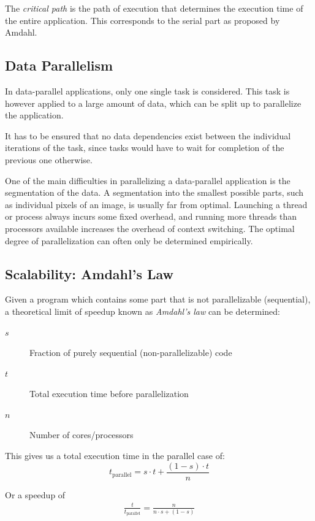 \documentclass[BCOR20mm,DIV14,10pt,headinclude,footexclude,bibtotoc,liststotoc]{article}
\begin{document}
The \emph{critical path} is the path of execution that determines the execution
time of the entire application. This corresponds to the serial part as proposed
by Amdahl.

\subsection{Data Parallelism}
In data-parallel applications, only one single task is considered. This task is
however applied to a large amount of data, which can be split up to parallelize
the application.

It has to be ensured that no data dependencies exist between the individual
iterations of the task, since tasks would have to wait for completion of the
previous one otherwise.

One of the main difficulties in parallelizing a data-parallel application is the
segmentation of the data. A segmentation into the smallest possible parts, such
as individual pixels of an image, is usually far from optimal. Launching a
thread or process always incurs some fixed overhead, and running more threads
than processors available increases the overhead of context switching. The
optimal degree of parallelization can often only be determined empirically.




\subsection{Scalability: Amdahl's Law}
Given a program which contains some part that is not parallelizable
(sequential), a theoretical limit of speedup known as \emph{Amdahl's law}
can be determined:
\begin{description}
	\item[$s$] Fraction of purely sequential (non-parallelizable) code
	\item[$t$] Total execution time before parallelization
	\item[$n$] Number of cores/processors
\end{description}

This gives us a total execution time in the parallel case of:
\begin{equation}
	t_\text{parallel} = s \cdot t + \frac{(1-s)\cdot t}{n}
\end{equation}

Or a speedup of
\begin{eqnarray}
	\frac{t}{t_\text{parallel}} = \frac{n}{n \cdot s + (1-s)}
\end{eqnarray}
\end{document}
